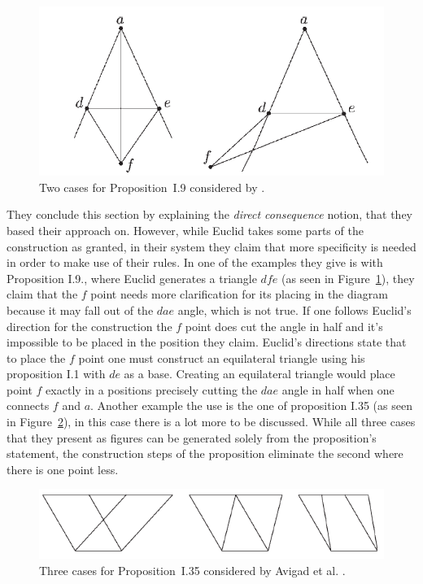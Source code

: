 \documentclass[]{interact}
\theoremstyle{plain}
\theoremstyle{definition}
\theoremstyle{remark}
\newcommand{\term}[1]{\emph{#1\/}}
\begin{document}
\begin{figure}[t]
  \centering
  \includegraphics[scale=0.5]{avigad-fig8-I9}
  \caption[Avigad et al Approach I.9]{Two cases for Proposition~I.9
    considered by \citet{avigad-etal:2009}.}
  \label{fig:avigadi9}
\end{figure}


They conclude this section by explaining the \term{direct consequence}
notion, that they based their approach on. However, while Euclid takes
some parts of the construction as granted, in their system they claim
that more specificity is needed in order to make use of their rules.
In one of the examples they give is with Proposition I.9., where
Euclid generates a triangle $dfe$ (as seen in
Figure~\ref{fig:avigadi9}), they claim that the $f$ point needs more
clarification for its placing in the diagram because it may fall out
of the $dae$ angle, which is not true. If one follows Euclid's
direction for the construction the $f$ point does cut the angle in
half and it's impossible to be placed in the position they claim.
Euclid's directions state that to place the $f$ point one must
construct an equilateral triangle using his proposition I.1 with $de$
as a base. Creating an equilateral triangle would place point $f$
exactly in a positions precisely cutting the $dae$ angle in half when
one connects $f$ and $a$. Another example the use is the one of
proposition I.35 (as seen in Figure~\ref{fig:avigadi35}), in this case
there is a lot more to be discussed. While all three cases that they
present as figures can be generated solely from the proposition's
statement, the construction steps of the proposition eliminate the
second where there is one point less.


\begin{figure}[h]
  \centering
  \includegraphics[scale=0.7]{avigad-fig9-I35}
  \caption[Avigad et al Approach I.35]{Three cases for
    Proposition~I.35 considered by Avigad et al. \cite{avigad-etal:2009}.}
  \label{fig:avigadi35}
\end{figure}
\end{document}
